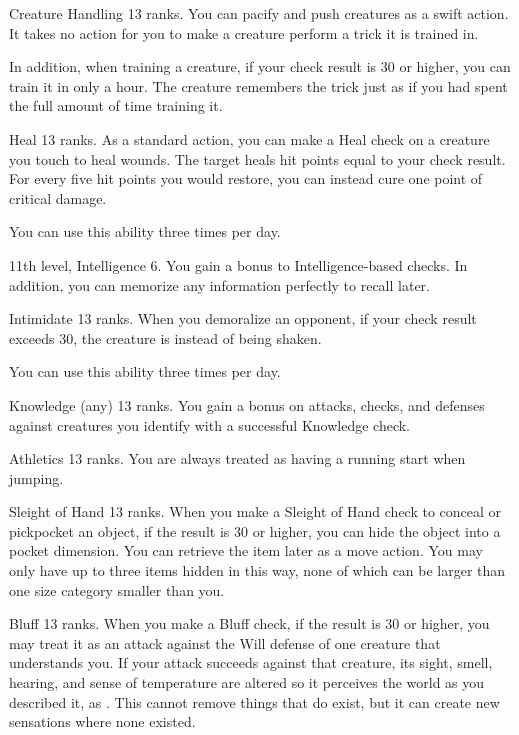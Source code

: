 \featpre Creature Handling 13 ranks.
\featben You can pacify and push creatures as a swift action.
It takes no action for you to make a creature perform a trick it is trained in.

In addition, when training a creature, if your check result is 30 or higher, you can train it in only a hour.
The creature remembers the trick just as if you had spent the full amount of time training it.

\featpre Heal 13 ranks.
\featben As a standard action, you can make a Heal check on a creature you touch to heal wounds.
The target heals hit points equal to your check result.
For every five hit points you would restore, you can instead cure one point of critical damage.

You can use this ability three times per day.

\featpres 11th level, Intelligence 6.
\featben You gain a  bonus to Intelligence-based checks.
In addition, you can memorize any information perfectly to recall later.

\featpre Intimidate 13 ranks.
\featben When you demoralize an opponent, if your check result exceeds 30, the creature is \panicked instead of being shaken.

You can use this ability three times per day.

\featpre Knowledge (any) 13 ranks.
\featben You gain a  bonus on attacks, checks, and defenses against creatures you identify with a successful Knowledge check.

\featpre Athletics 13 ranks.
\featben You are always treated as having a running start when jumping.

\featpre Sleight of Hand 13 ranks.
\featben When you make a Sleight of Hand check to conceal or pickpocket an object, if the result is 30 or higher, you can hide the object into a pocket dimension.
You can retrieve the item later as a move action.
You may only have up to three items hidden in this way, none of which can be larger than one size category smaller than you.

\featpre Bluff 13 ranks.
\featben When you make a Bluff check, if the result is 30 or higher, you may treat it as an attack against the Will defense of one creature that understands you.
If your attack succeeds against that creature, its sight, smell, hearing, and sense of temperature are altered so it perceives the world as you described it, as .
This cannot remove things that do exist, but it can create new sensations where none existed.


